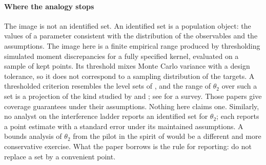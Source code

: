 \paragraph{Where the analogy stops} The image is not an identified set. An
identified set is a population object: the values of a parameter consistent with
the distribution of the observables and the assumptions. The image here is a
finite empirical range produced by thresholding simulated moment discrepancies for
a fully specified kernel, evaluated on a sample of kept points. Its threshold mixes
Monte Carlo variance with a design tolerance, so it does not correspond to a
sampling distribution of the targets. A thresholded criterion resembles the level
sets of \citet{chernozhukov2007}, and the range of $\theta_2$ over such a set is a
projection of the kind studied by \citet{imbens2004} and \citet{kaido2019}; see
\citet{molinari2020} for a survey. Those papers give coverage guarantees under
their assumptions. Nothing here claims one. Similarly, no analyst on the
interference ladder reports an identified set for $\theta_2$; each reports a point
estimate with a standard error under its maintained assumptions. A bounds analysis
of $\theta_2$ from the pilot in the spirit of \citet{manski2013} would be a
different and more conservative exercise. What the paper borrows is the rule for
reporting: do not replace a set by a convenient point.
